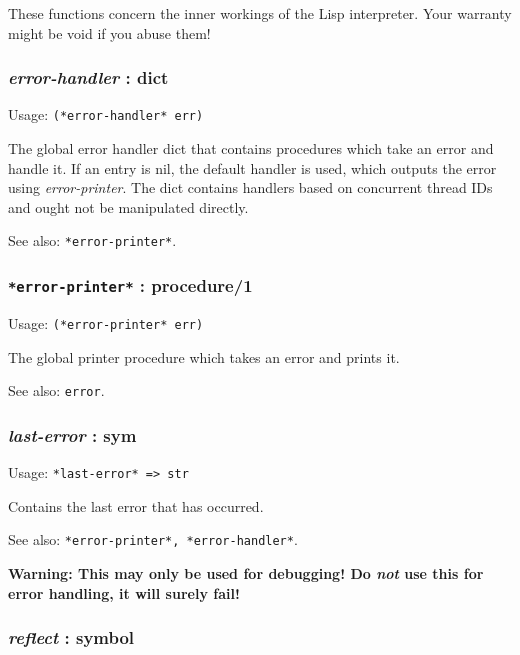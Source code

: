 \documentclass[
]{article}
\newcommand{\passthrough}[1]{#1}
\begin{document}
These functions concern the inner workings of the Lisp interpreter. Your
warranty might be void if you abuse them!

\hypertarget{error-handler-dict}{%
\subsubsection{\texorpdfstring{\emph{error-handler} :
dict}{error-handler : dict}}\label{error-handler-dict}}

Usage: \passthrough{\lstinline!(*error-handler* err)!}

The global error handler dict that contains procedures which take an
error and handle it. If an entry is nil, the default handler is used,
which outputs the error using \emph{error-printer}. The dict contains
handlers based on concurrent thread IDs and ought not be manipulated
directly.

See also: \passthrough{\lstinline!*error-printer*!}.

\hypertarget{error-printer-procedure1}{%
\subsubsection{\texorpdfstring{\texttt{*error-printer*} :
procedure/1}{*error-printer* : procedure/1}}\label{error-printer-procedure1}}

Usage: \passthrough{\lstinline!(*error-printer* err)!}

The global printer procedure which takes an error and prints it.

See also: \passthrough{\lstinline!error!}.

\hypertarget{last-error-sym}{%
\subsubsection{\texorpdfstring{\emph{last-error} :
sym}{last-error : sym}}\label{last-error-sym}}

Usage: \passthrough{\lstinline!*last-error* => str!}

Contains the last error that has occurred.

See also: \passthrough{\lstinline!*error-printer*, *error-handler*!}.

\textbf{Warning: This may only be used for debugging! Do \emph{not} use
this for error handling, it will surely fail!}

\hypertarget{reflect-symbol}{%
\subsubsection{\texorpdfstring{\emph{reflect} :
symbol}{reflect : symbol}}\label{reflect-symbol}}
\end{document}
